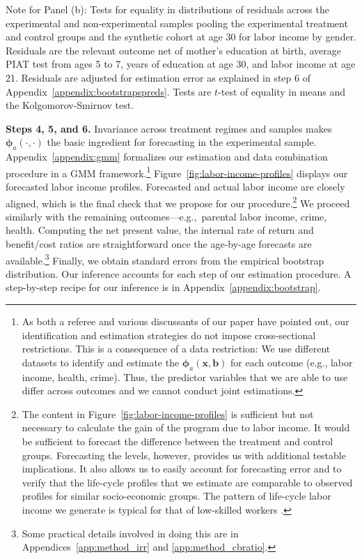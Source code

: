 \begin{table}[!htpb]
\begin{threeparttable}
\begin{tablenotes}
Note for Panel (b): Tests for equality in distributions of residuals across the experimental and non-experimental samples pooling the experimental treatment and control groups and the synthetic cohort at age 30 for labor income by gender.  Residuals are the relevant outcome net of mother's education at birth, average PIAT test from ages 5 to 7, years of education at age 30, and labor income at age 21. Residuals are adjusted for estimation error as explained in step 6 of Appendix~\ref{appendix:bootstrapspreds}. Tests are $t$-test of equality in means and the Kolgomorov-Smirnov test.\\
\end{tablenotes}
\end{threeparttable}
\end{table}

\textbf{Steps 4, 5, and 6.} \label{section:following} Invariance across treatment regimes and samples makes $\bm{\phi}_{a} (\cdot, \cdot)$ the basic ingredient for forecasting in the experimental sample. Appendix~\ref{appendix:gmm} formalizes our estimation and data combination procedure in a GMM framework.\footnote{As both a referee and various discussants of our paper have pointed out, our identification and estimation strategies do not impose cross-sectional restrictions. This is a consequence of a data restriction: We use different datasets to identify and estimate the  $\bm{\phi}_{a} \left( \bm{x}, \bm{b} \right)$ for each outcome (e.g., labor income, health, crime). Thus, the predictor variables that we are able to use differ across outcomes and we cannot conduct joint estimations.} Figure~\ref{fig:labor-income-profiles} displays our forecasted labor income profiles. Forecasted and actual labor income are closely aligned, which is the final check that we propose for our procedure.\footnote{The content in Figure~\ref{fig:labor-income-profiles} is sufficient but not necessary to calculate the gain of the program due to labor income. It would be sufficient to forecast the difference between the treatment and control groups. Forecasting the levels, however, provides us with additional testable implications. It also allows us to easily account for forecasting error and to verify that the life-cycle profiles that we estimate are comparable to observed profiles for similar socio-economic groups. The pattern of life-cycle labor income we generate is typical for that of low-skilled workers \citep{Blundell-etal_2015_J-Pub-E,Gladden_Taber_2000_WageProgression,Sanders-Taber_2012_AR,Lagakos_Moll_etal_2016_LifeCycle_NBER}.} We proceed similarly with the remaining outcomes---e.g.,\ parental labor income, crime, health. Computing the net present value, the internal rate of return and benefit/cost ratios are straightforward once the age-by-age forecasts are available.\footnote{Some practical details involved in doing this are in Appendices~\ref{app:method_irr} and \ref{app:method_cbratio}.} Finally, we obtain standard errors from the empirical bootstrap distribution. Our inference accounts for each step of our estimation procedure. A step-by-step recipe for our inference is in Appendix~\ref{appendix:bootstrap}.

